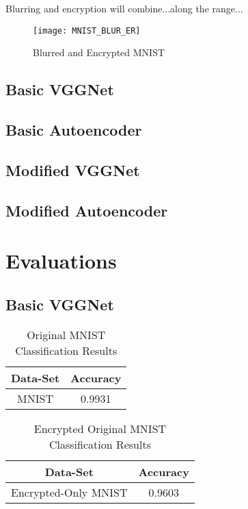 \documentclass[12pt, titlepage]{article}
\begin{document}
Blurring and encryption will combine...along the range...

\begin{figure}[h!]
	\begin{center}
		\texttt{[image: MNIST\_BLUR\_ER]}
		\caption{Blurred and Encrypted MNIST}
		\label{MNIST_BLURRED_EN}
	\end{center}
\end{figure} 
 
\subsection{Basic VGGNet} 

\subsection{Basic Autoencoder} 

\subsection{Modified VGGNet} 

\subsection{Modified Autoencoder} 
 
\section{Evaluations}
\subsection{Basic VGGNet} 

\begin{table}[!h]
	\begin{center}
		\begin{tabular}{| c | c |}
			\hline
			\textbf{Data-Set} & \textbf{Accuracy}\\
			\hline
			MNIST & 0.9931\\
			\hline
		\end{tabular}
		\caption{Original MNIST Classification Results}
		\label{table:basicVGG_MNIST}
	\end{center}
\end{table}

\begin{table}[!h]
	\begin{center}
		\begin{tabular}{| c | c |}
			\hline
			\textbf{Data-Set} & \textbf{Accuracy}\\
			\hline
			Encrypted-Only MNIST & 0.9603\\
			\hline
		\end{tabular}
		\caption{Encrypted Original MNIST Classification Results}
		\label{table:basicVGG_Encryption}
	\end{center}
\end{table}
\end{document}
